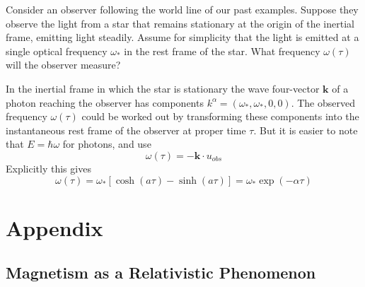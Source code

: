 \begin{eg}
    Consider an observer following the world line of our past examples. Suppose they observe the light from a star that remains stationary at the origin of the inertial frame, emitting light steadily. Assume for simplicity that the light is emitted at a single optical frequency $\omega_*$ in the rest frame of the star. What frequency $\omega(\tau)$ will the observer measure?

    In the inertial frame in which the star is stationary the wave four-vector $\mathbf{k}$ of a photon reaching the observer has components $k^{\alpha} = (\omega_*,\omega_*,0,0)$. The observed frequency $\omega(\tau)$ could be worked out by transforming these components into the instantaneous rest frame of the observer at proper time $\tau$. But it is easier to note that $E = \hbar\omega$ for photons, and use $$\omega(\tau) = -\mathbf{k}\cdot u_{obs}$$
    Explicitly this gives $$\omega(\tau) = \omega_*[\cosh(a\tau)-\sinh(a\tau)]=\omega_*\exp(-\alpha\tau)$$
\end{eg}








%
\section*{Appendix}

\subsection{Magnetism as a Relativistic Phenomenon}

